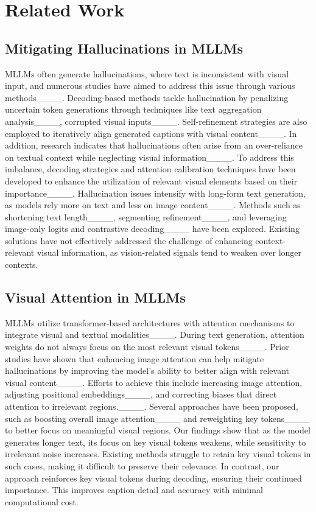 \section{Related Work}
\subsection{Mitigating Hallucinations in MLLMs}  
MLLMs often generate hallucinations, where text is inconsistent with visual input, and numerous studies have aimed to address this issue through various methods____. Decoding-based methods tackle hallucination by penalizing uncertain token generations through techniques like text aggregation analysis____, corrupted visual inputs____. Self-refinement strategies are also employed to iteratively align generated captions with visual content____. In addition, research indicates that hallucinations often arise from an over-reliance on textual context while neglecting visual information____. To address this imbalance, decoding strategies and attention calibration techniques have been developed to enhance the utilization of relevant visual elements based on their importance____. Hallucination issues intensify with long-form text generation, as models rely more on text and less on image content____. Methods such as shortening text length____, segmenting refinement____, and leveraging image-only logits and contrastive decoding____ have been explored. Existing solutions have not effectively addressed the challenge of enhancing context-relevant visual information, as vision-related signals tend to weaken over longer contexts.

\subsection{Visual Attention in MLLMs}

MLLMs utilize transformer-based architectures with attention mechanisms to integrate visual and textual modalities____. During text generation, attention weights do not always focus on the most relevant visual tokens____. Prior studies have shown that enhancing image attention can help mitigate hallucinations by improving the model's ability to better align with relevant visual content____. Efforts to achieve this include increasing image attention, adjusting positional embeddings____, and correcting biases that direct attention to irrelevant regions.____.
Several approaches have been proposed, such as boosting overall image attention____ and reweighting key tokens____ to better focus on meaningful visual regions. Our findings show that as the model generates longer text, its focus on key visual tokens weakens, while sensitivity to irrelevant noise increases. Existing methods struggle to retain key visual tokens in such cases, making it difficult to preserve their relevance. In contrast, our approach reinforces key visual tokens during decoding, ensuring their continued importance. This improves caption detail and accuracy with minimal computational cost.